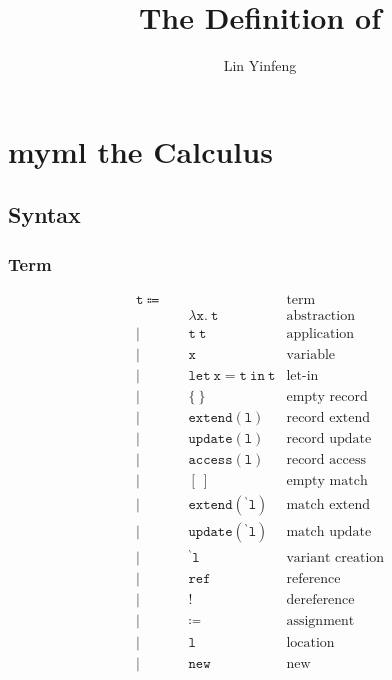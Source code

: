 \documentclass{report}
\title{The Definition of \theLang}
\author{Lin Yinfeng}
\newcommand{\theLang}{myml}
\newcommand{\code}{\mathtt}
\newcommand{\backtick}{{}^{\backprime}}
\begin{document}
\maketitle

\tableofcontents

\chapter{\theLang{} the Calculus}

\section{Syntax}

\subsection{Term}

\begin{align*}
\code{t} \Coloneqq \quad & & \text{term} \\
& \code{\lambda x.\ t} & \text{abstraction} \\
| \quad & \code{t\ t} & \text{application} \\
| \quad & \code{x} & \text{variable} \\
| \quad & \code{let\ x = t\ in\ t} & \text{let-in} \\
| \quad & \code{\{\ \}} & \text{empty record} \\
| \quad & \code{extend(l)} & \text{record extend} \\
| \quad & \code{update(l)} & \text{record update} \\
| \quad & \code{access(l)} & \text{record access} \\
| \quad & \code{[\ ]} & \text{empty match} \\
| \quad & \code{extend(\backtick l)} & \text{match extend} \\
| \quad & \code{update(\backtick l)} & \text{match update} \\
| \quad & \code{\backtick l} & \text{variant creation} \\
| \quad & \code{ref} & \text{reference} \\
| \quad & \code{!} & \text{dereference} \\
| \quad & \code{\coloneqq} & \text{assignment} \\
| \quad & \code{l} & \text{location} \\
| \quad & \code{new} & \text{new}
\end{align*}
\end{document}
